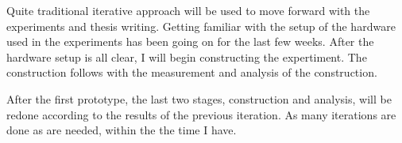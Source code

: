 Quite traditional iterative approach will be used to move forward with the experiments and thesis writing. Getting familiar with the setup of the hardware used in the experiments has been going on for the last few weeks. After the hardware setup is all clear, I will begin constructing the expertiment. The construction follows with the measurement and analysis of the construction.

After the first prototype, the last two stages, construction and analysis, will be redone according to the results of the previous iteration. As many iterations are done as are needed, within the the time I have.


